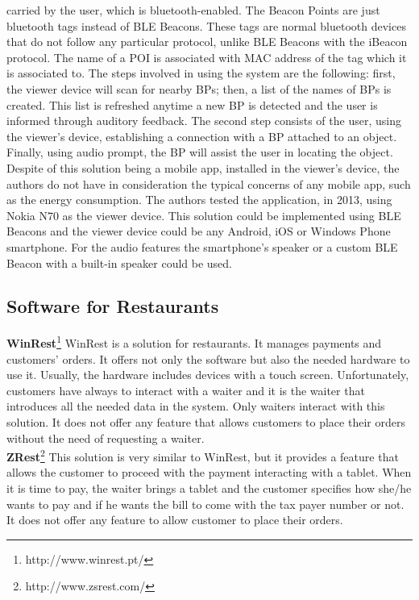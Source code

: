 carried by the user, which is bluetooth-enabled.
The Beacon Points are just bluetooth tags instead of
BLE Beacons. These tags are normal bluetooth devices
that do not follow any particular protocol, unlike
BLE Beacons with the iBeacon protocol.
The name of a POI is associated with
MAC address of the tag which it is associated to.
The steps involved in using the system are the
following: first, the viewer device will scan
for nearby BPs; then, a list of the names of
BPs is created. This list is refreshed anytime a new
BP is detected and the user is informed through auditory
feedback. The second step consists of the user, using
the viewer's device, establishing a connection with a BP
attached to an object. Finally, using audio prompt, the BP
will assist the user in locating the object.
Despite of this solution being a mobile app, installed
in the viewer's device, the authors do not have in
consideration the typical concerns of any mobile app,
such as the energy consumption.
The authors tested the application, in 2013,
using Nokia N70 as the viewer device.
This solution could be implemented using BLE Beacons
and the viewer device could be any Android, iOS or
Windows Phone smartphone.
For the audio features the smartphone's speaker or
a custom BLE Beacon with a built-in speaker could be
used.

\subsection{Software for Restaurants}
\label{subs:software_for_restaurants}
\textbf{WinRest}\footnote{http://www.winrest.pt/}
WinRest is a solution for restaurants. It manages payments
and customers' orders. It offers not only the software but also the
needed hardware to use it. Usually, the hardware includes devices with
a touch screen. Unfortunately, customers have always to interact
with a waiter and it is the waiter that introduces all the needed data
in the system. Only waiters interact with this solution. It does not
offer any feature that allows customers to place their orders
without the need of requesting a waiter.
\\
\textbf{ZRest}\footnote{http://www.zsrest.com/}
This solution is very similar to WinRest, but it provides
a feature that allows the
customer to proceed with the payment interacting with a tablet.
When it is time to pay, the waiter brings a tablet and the customer
specifies how she/he wants to pay and if he wants the bill to come with
the tax payer number or not.
It does not offer any feature to allow customer to place their orders.
\\

